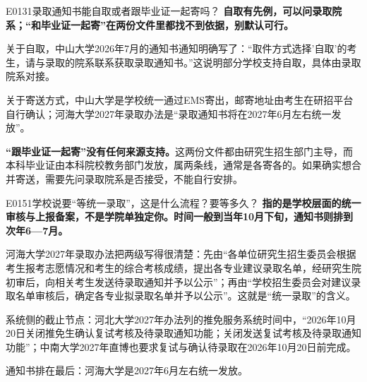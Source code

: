 \begin{qa}{E0131}{录取通知书能自取或者跟毕业证一起寄吗？}
\textbf{自取有先例，可以问录取院系；“和毕业证一起寄”在两份文件里都找不到依据，别默认可行。}

关于自取，中山大学2026年7月的通知书通知明确写了：“取件方式选择'自取'的考生，请与录取的院系联系获取录取通知书。”这说明部分学校支持自取，具体由录取院系对接。

关于寄送方式，中山大学是学校统一通过EMS寄出，邮寄地址由考生在研招平台自行确认；河海大学2027年录取办法是“录取通知书将在2027年6月左右统一发放”。

\textbf{“跟毕业证一起寄”没有任何来源支持。}这两份文件都由研究生招生部门主导，而本科毕业证由本科院校教务部门发放，属两条线，通常是各寄各的。如果确实想合并寄送，需要先问录取院系是否接受，不能自行安排。
\end{qa}

\begin{qa}{E0151}{学校说要“等统一录取”，这是什么流程？要等多久？}
\textbf{指的是学校层面的统一审核与上报备案，不是学院单独定你。时间一般到当年10月下旬，通知书则排到次年6—7月。}

河海大学2027年录取办法把两级写得很清楚：先由“各单位研究生招生委员会根据考生报考志愿情况和考生的综合考核成绩，提出各专业建议录取名单，经研究生院初审后，向相关考生发送待录取通知并予以公示”；再由“学校招生委员会对建议录取名单审核后，确定各专业拟录取名单并予以公示”。这就是“统一录取”的含义。

系统侧的截止节点：河北大学2027年办法列的推免服务系统时间中，“2026年10月20日关闭推免生确认复试考核及待录取通知功能；关闭发送复试考核及待录取通知功能”；中南大学2027年直博也要求复试与确认待录取在2026年10月20日前完成。

通知书排在最后：河海大学是2027年6月左右统一发放。
\end{qa}


